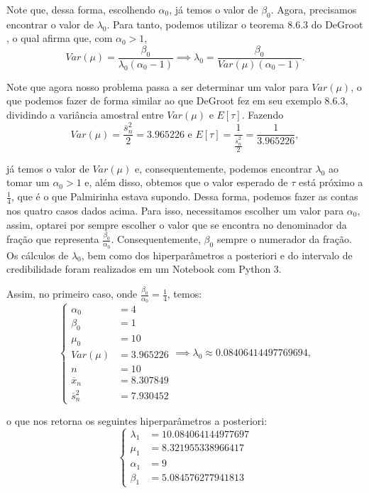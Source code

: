 \documentclass{article}
\begin{document}
Note que, dessa forma, escolhendo $\alpha_0$, já temos o valor de $\beta_0$. Agora, precisamos encontrar o valor de $\lambda_0$. Para tanto, podemos utilizar o teorema 8.6.3 do DeGroot \cite{degroot}, o qual afirma que, com $\alpha_0 > 1$,
\[Var(\mu) = \dfrac{\beta_0}{\lambda_0 \left(\alpha_0 - 1\right)} \implies \lambda_0 = \dfrac{\beta_0}{Var(\mu) \left(\alpha_0 - 1\right)}.\]

Note que agora nosso problema passa a ser determinar um valor para $Var(\mu)$, o que podemos fazer de forma similar ao que DeGroot fez em seu exemplo 8.6.3, dividindo a variância amostral entre $Var(\mu)$ e $E[\tau]$. Fazendo
\[Var(\mu) = \dfrac{\overline{s}_n^2}{2} = 3.965226 \text{ e } E[\tau] = \dfrac{1}{\frac{\overline{s}_n^2}{2}} = \dfrac{1}{3.965226},\]

\noindent já temos o valor de $Var(\mu)$ e, consequentemente, podemos encontrar $\lambda_0$ ao tomar um $\alpha_0 > 1$ e, além disso, obtemos que o valor esperado de $\tau$ está próximo a $\frac{1}{4}$, que é o que Palmirinha estava supondo. Dessa forma, podemos fazer as contas nos quatro casos dados acima. Para isso, necessitamos escolher um valor para $\alpha_0$, assim, optarei por sempre escolher o valor que se encontra no denominador da fração que representa $\frac{\beta_0}{\alpha_0}$. Consequentemente, $\beta_0$ sempre o numerador da fração. Os cálculos de $\lambda_0$, bem como dos hiperparâmetros a posteriori e do intervalo de credibilidade foram realizados em um Notebook com Python 3.

Assim, no primeiro caso, onde $\frac{\beta_0}{\alpha_0} = \frac{1}{4}$, temos:
\begin{equation*}
    \left\{
        \begin{array}{ll}
            \alpha_0 & = 4 \\
            \beta_0 & = 1 \\
            \mu_0 & = 10 \\
            Var(\mu) & = 3.965226 \\
            n & = 10 \\
            \overline{x}_n & = 8.307849 \\
            \overline{s}_n^2 & = 7.930452
        \end{array}
    \right.
    \implies \lambda_0 \approx 0.08406414497769694,
\end{equation*}

\noindent o que nos retorna os seguintes hiperparâmetros a posteriori:
\begin{equation*}
    \left\{
        \begin{array}{ll}
            \lambda_1 & = 10.084064144977697 \\
            \mu_1 & = 8.321955338966417 \\
            \alpha_1 & = 9 \\
            \beta_1 & = 5.084576277941813
        \end{array}
    \right.
\end{equation*}
\end{document}
